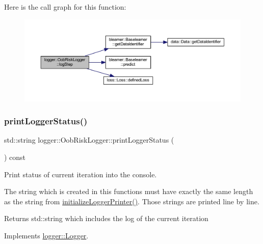 Here is the call graph for this function\+:\nopagebreak
\begin{figure}[H]
\begin{center}
\leavevmode
\includegraphics[width=350pt]{classlogger_1_1_oob_risk_logger_a948a89f02ac782c25a15c49c4a108c02_cgraph}
\end{center}
\end{figure}
\mbox{\label{classlogger_1_1_oob_risk_logger_acab1638b5112232c86c2208b91f649fb}} 
\subsubsection{\texorpdfstring{print\+Logger\+Status()}{printLoggerStatus()}}
{\footnotesize\ttfamily std\+::string logger\+::\+Oob\+Risk\+Logger\+::print\+Logger\+Status (\begin{DoxyParamCaption}{ }\end{DoxyParamCaption}) const\hspace{0.3cm}{\ttfamily [virtual]}}



Print status of current iteration into the console. 

The string which is created in this functions must have exactly the same length as the string from {\ttfamily \mbox{\hyperlink{classlogger_1_1_oob_risk_logger_afb230d22eea9b1c025e6ff95685c692c}{initialize\+Logger\+Printer()}}}. Those strings are printed line by line.

\begin{DoxyReturn}{Returns}
{\ttfamily std\+::string} which includes the log of the current iteration 
\end{DoxyReturn}


Implements \mbox{\hyperlink{classlogger_1_1_logger_abad818a7e8053ca84cb267e883b5e377}{logger\+::\+Logger}}.

